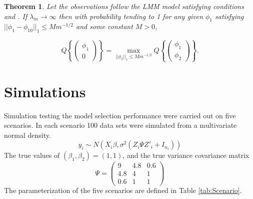 \documentclass{article}
\newtheorem{thm}{Theorem}
\begin{document}
\begin{thm}
\label{thm2}
Let the observations follow the LMM model satisfying conditions  and . If $\lambda_m \rightarrow \infty$ then with probability tending to 1 for any given $\phi_1$ satisfying $||\phi_1-\phi_{10}||_1\le Mm^{-1/2}$ and some constant $M>0$,

  $$ Q\left\lbrace\left(
		\begin{array}{c}
			\phi_1 \\ 0
		\end{array}
		\right)  \right\rbrace
		=\max\limits_{||\phi_2||_1\le Mm^{-1/2}}
	Q\left\lbrace\left(
		\begin{array}{c}
		\phi_1 \\ \phi_2
		\end{array}
		\right)\right\rbrace.
	$$
\end{thm}

\section{Simulations}
Simulation testing the model selection performance were carried out on five scenarios. In each scenario 100 data sets were simulated from a multivariate normal density. $$y_i\sim N(X_i\beta,\sigma^2(Z_i\Psi Z'_i+I_{n_i}))$$
The true values of $(\beta_1,\beta_2)=(1,1)$, and the true variance covariance matrix
		$$ \Psi= \left(
		\begin{array}{ccc}
			9   & 4.8 & 0.6 \\
			4.8 & 4   & 1   \\
			0.6 & 1   & 1
		\end{array}
		\right) $$
The parameterization of the five scenarios are defined in Table \ref{tab:Scenario}.
\begin{table}[h]
		  \centering
\ %
\caption{Simulation Scenarios}
\label{tab:Scenario}
\end{table}
\end{document}

